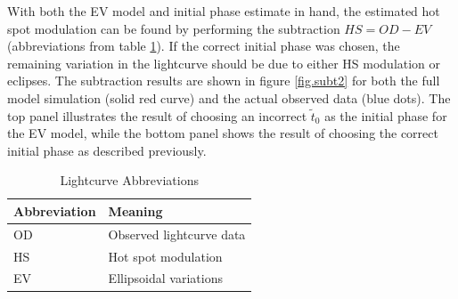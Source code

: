 \documentclass[preprint2]{aastex}
\begin{document}
With both the EV model and initial phase estimate in hand, the estimated hot
spot modulation can be found by performing the subtraction $HS = OD - EV$ (abbreviations from table \ref{table.abbrev}). If the correct initial phase was chosen, the remaining variation in the lightcurve should be due to either HS modulation or eclipses. The subtraction results are shown in figure \ref{fig.subt2} for both the full model simulation (solid red curve) and the actual observed data (blue dots). The top panel illustrates the result of choosing an incorrect $\tilde{t}_0$ as the initial phase for the EV model, while the bottom panel shows the result of choosing the correct initial phase as described previously. 

\begin{table}[h]
\caption{Lightcurve Abbreviations}
\centering
\begin{tabular}{l l}
\hline \hline
Abbreviation & Meaning\\
\hline
OD & Observed lightcurve data\\
HS & Hot spot modulation\\
EV & Ellipsoidal variations\\
\hline
\end{tabular}
\label{table.abbrev}
\end{table}


\end{document}
